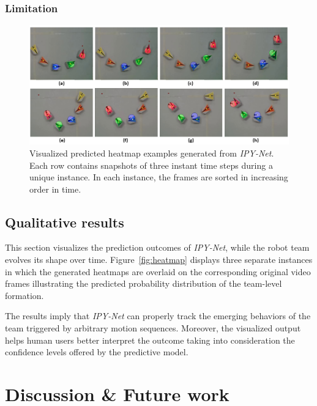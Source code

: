 \documentclass[letterpaper, 10 pt, conference]{ieeeconf}  %
\begin{document}
	
	\subsubsection{Limitation} 
	\label{sec:limitation}
	
	
	
	
	\begin{figure}[t]
		\centering
		\includegraphics[width=1.8\columnwidth]{fig_preds}
		\caption{Visualized predicted heatmap examples generated from \emph{IPY-Net}. 
			Each row contains snapshots of three instant time steps during a unique 
			instance. In each instance, the frames are sorted in increasing order in time. 			 
		}
		\label{fig:preds}
	\end{figure}

	
	\subsection{Qualitative results} 
	\label{sec:qualitative_results} 

	This section visualizes the prediction outcomes of \emph{IPY-Net}, while the robot team
	evolves its shape over time. Figure~\ref{fig:heatmap} displays three separate instances in which 
	the generated heatmaps are overlaid on the corresponding original video frames illustrating 
	the predicted probability distribution of the team-level formation. 
	
	The results imply that \emph{IPY-Net} can properly track the emerging behaviors of the team 
	triggered by arbitrary motion sequences. Moreover, the visualized output helps
	human users better interpret the outcome taking into consideration the confidence levels 
	offered by the predictive model. 
	

	\section{Discussion \& Future work}
	\label{sec:discussion_and_future_work}
	
\end{document}
